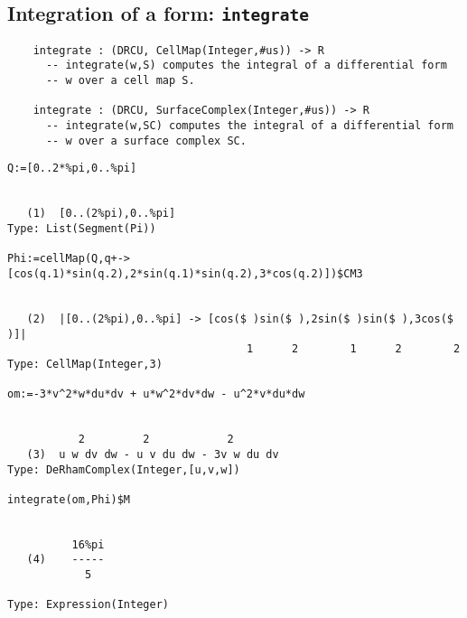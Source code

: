 \documentclass[12pt,a4paper]{article}
\begin{document}
\subsection{Integration of a form: {\tt integrate}}
\begin{lstlisting}
    integrate : (DRCU, CellMap(Integer,#us)) -> R
	  -- integrate(w,S) computes the integral of a differential form
	  -- w over a cell map S.
	  
    integrate : (DRCU, SurfaceComplex(Integer,#us)) -> R
	  -- integrate(w,SC) computes the integral of a differential form
	  -- w over a surface complex SC.
\end{lstlisting}
\scriptsize
\begin{verbatim}
Q:=[0..2*%pi,0..%pi]
 

   (1)  [0..(2%pi),0..%pi]
Type: List(Segment(Pi))

Phi:=cellMap(Q,q+->[cos(q.1)*sin(q.2),2*sin(q.1)*sin(q.2),3*cos(q.2)])$CM3
 

   (2)  |[0..(2%pi),0..%pi] -> [cos($ )sin($ ),2sin($ )sin($ ),3cos($ )]|
                                     1      2        1      2        2
Type: CellMap(Integer,3)

om:=-3*v^2*w*du*dv + u*w^2*dv*dw - u^2*v*du*dw
 

           2         2            2
   (3)  u w dv dw - u v du dw - 3v w du dv
Type: DeRhamComplex(Integer,[u,v,w])

integrate(om,Phi)$M  
 

          16%pi
   (4)    -----
            5
                                                    
Type: Expression(Integer)
\end{verbatim}
\normalsize
%
%
%
\end{document}
